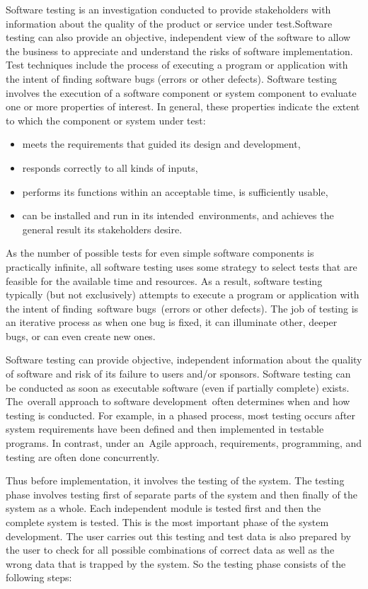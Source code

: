 Software testing is an investigation conducted to provide stakeholders with information about the quality of the product or service under test.Software testing can also provide an objective, independent view of the software to allow the business to appreciate and understand the risks of software implementation. Test techniques include the process of executing a program or application with the intent of finding software bugs (errors or other defects). Software testing involves the execution of a software component or system component to evaluate one or more properties of interest. In general, these properties indicate the extent to which the component or system under test:
\begin{itemize}
	\item meets the requirements that guided its design and development,
	\item responds correctly to all kinds of inputs,
	\item performs its functions within an acceptable time,
	is sufficiently usable,
	\item can be installed and run in its intended environments, and achieves the general result its stakeholders desire.
\end{itemize}

As the number of possible tests for even simple software components is practically infinite, all software testing uses some strategy to select tests that are feasible for the available time and resources. As a result, software testing typically (but not exclusively) attempts to execute a program or application with the intent of finding software bugs (errors or other defects). The job of testing is an iterative process as when one bug is fixed, it can illuminate other, deeper bugs, or can even create new ones.

Software testing can provide objective, independent information about the quality of software and risk of its failure to users and/or sponsors.
Software testing can be conducted as soon as executable software (even if partially complete) exists. The overall approach to software development often determines when and how testing is conducted. For example, in a phased process, most testing occurs after system requirements have been defined and then implemented in testable programs. In contrast, under an Agile approach, requirements, programming, and testing are often done concurrently.

Thus before implementation, it involves the testing of the system. The testing phase involves testing first of separate parts of the system and then finally of the system as a whole. Each independent module is tested first and then the complete system is tested. This is the most important phase of the system development. The user carries out this testing and test data is also prepared by the user to check for all possible combinations of correct data as well as the wrong data that is trapped by the system. So the testing phase consists of the following steps:

